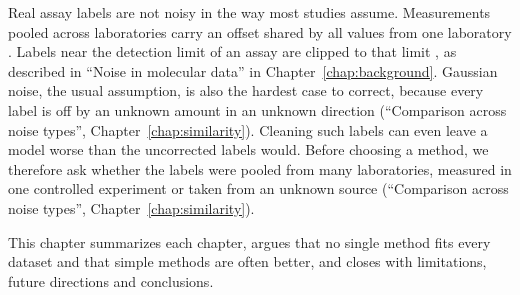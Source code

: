 Real assay labels are not noisy in the way most studies assume. Measurements pooled across laboratories carry an offset shared by all values from one laboratory \citep{Bentz2013}. Labels near the detection limit of an assay are clipped to that limit \citep{Svensson2025}, as described in ``Noise in molecular data'' in Chapter~\ref{chap:background}. Gaussian noise, the usual assumption, is also the hardest case to correct, because every label is off by an unknown amount in an unknown direction (``Comparison across noise types'', Chapter~\ref{chap:similarity}). Cleaning such labels can even leave a model worse than the uncorrected labels would. Before choosing a method, we therefore ask whether the labels were pooled from many laboratories, measured in one controlled experiment or taken from an unknown source (``Comparison across noise types'', Chapter~\ref{chap:similarity}).

This chapter summarizes each chapter, argues that no single method fits every dataset and that simple methods are often better, and closes with limitations, future directions and conclusions. %



